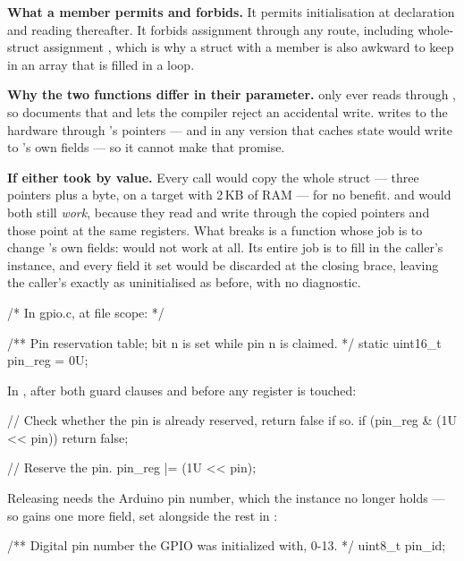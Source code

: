 \textbf{What a  member permits and forbids.} It permits initialisation at declaration
and reading thereafter. It forbids assignment through any route, including whole-struct assignment
, which is why a struct with a  member is also awkward to keep in
an array that is filled in a loop. 

\textbf{Why the two functions differ in their parameter.}  only ever reads through
, so  documents that and lets the compiler reject an accidental
write.  writes to the hardware through 's pointers --- and in any
version that caches state would write to 's own fields --- so it cannot make that
promise. 

\textbf{If either took  by value.} Every call would copy the whole struct ---
three pointers plus a byte, on a target with 2\,KB of RAM --- for no benefit.  and
 would both still \emph{work}, because they read and write through the copied
pointers and those point at the same registers. What breaks is a function whose job is to change
's own fields:  would not work at all. Its entire job is to fill in the
caller's instance, and every field it set would be discarded at the closing brace, leaving the
caller's  exactly as uninitialised as before, with no diagnostic. 

\begin{ccode}
/* In gpio.c, at file scope: */

/** Pin reservation table; bit n is set while pin n is claimed. */
static uint16_t pin_reg = 0U;
\end{ccode}

\noindent In , after both guard clauses and before any register is touched:

\begin{ccode}
    // Check whether the pin is already reserved, return false if so.
    if (pin_reg & (1U << pin)) { return false; }

    // Reserve the pin.
    pin_reg |= (1U << pin);
\end{ccode}

\noindent Releasing needs the Arduino pin number, which the instance no longer holds --- so
 gains one more field, set alongside the rest in :

\begin{ccode}
    /** Digital pin number the GPIO was initialized with, 0-13. */
    uint8_t pin_id;
\end{ccode}

